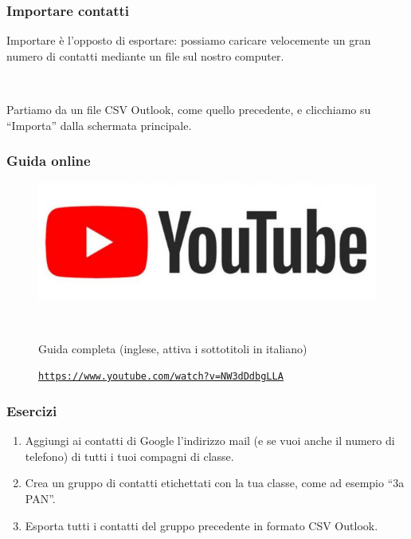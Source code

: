 \documentclass[]{beamer}
\begin{document}
\begin{frame}
\frametitle{Importare contatti}
Importare è l'opposto di esportare: possiamo caricare velocemente un gran numero di contatti mediante un \alert{file sul nostro computer}.\pause

~

Partiamo da un file CSV Outlook, come quello precedente, e clicchiamo su ``Importa'' dalla schermata principale.

\end{frame}




\begin{frame}
\frametitle{Guida online}
\begin{figure}
\includegraphics[width=.5\columnwidth]{img/ytlogo.jpg}

~

Guida completa (inglese, attiva i sottotitoli in italiano)

\href{https://www.youtube.com/watch?v=NW3dDdbgLLA}{\texttt{https://www.youtube.com/watch?v=NW3dDdbgLLA}}
\end{figure}
\end{frame}




\begin{frame}
\frametitle{Esercizi}
\begin{enumerate}
  \item Aggiungi ai contatti di Google l'indirizzo mail (e se vuoi anche il numero di telefono) di tutti i tuoi compagni di classe.
  \item Crea un gruppo di contatti etichettati con la tua classe, come ad esempio ``3a PAN''.
  \item Esporta tutti i contatti del gruppo precedente in formato CSV Outlook.
\end{enumerate}
\end{frame}
\end{document}
